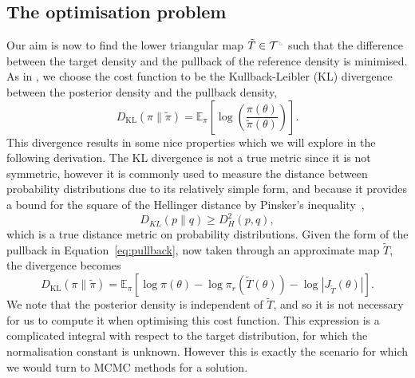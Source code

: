 \documentclass[final]{siamltex}
\newcommand{\ltri}{%
\,\resizebox{!}{0.25\baselineskip}{%
\begin{tikzpicture}%
\draw[line width=1mm](0,0) -- (0,2) -- (2,0)  -- (0,0);
\end{tikzpicture}%
}\xspace%
}%
\begin{document}
\subsection{The optimisation problem}
Our aim is now to find the lower triangular map $\tilde{T} \in
\mathcal{T}^{\ltri}$ such that the difference between the target
density and the pullback of the reference density is minimised. As in
\cite{parno2018transport}, we choose the cost function
to be the Kullback-Leibler (KL) divergence between the posterior density and the pullback density,
\begin{equation}
	D_\text{KL}(\pi\|\tilde{\pi}) =
		\mathbb{E}_\pi\left[\log\left(\frac{\pi(\theta)}{\tilde{\pi}(\theta)}\right)\right].
\end{equation}
This divergence results in some nice properties which we will explore in the following derivation. The KL divergence is not a true metric since it is not symmetric, however it is commonly used to measure the distance between probability distributions due to its relatively simple form, and because it provides a bound for the square of the Hellinger distance by Pinsker's inequality~\cite{pinsker1960information},
\begin{equation}
	D_{KL}(p\|q) \geq D_H^2(p,q),
\end{equation}
which is a true distance metric on probability distributions.
Given the form of the pullback in Equation~\eqref{eq:pullback}, now taken through an approximate map $\tilde{T}$, the divergence becomes
\begin{equation}
	D_\text{KL}(\pi\|\tilde{\pi}) = \mathbb{E}_\pi\left[\log\pi(\theta) - \log\pi_r(\tilde{T}(\theta)) -
		\log\left|J_{\tilde{T}}(\theta)\right|\right].
\end{equation}
We note that the posterior density is independent of $\tilde{T}$, and so it is not necessary for us to compute it when optimising this cost function. This expression is a complicated integral with respect to the target distribution, for which the normalisation constant is unknown. However this is exactly the scenario for which we would turn to MCMC methods for a solution.
\end{document}
